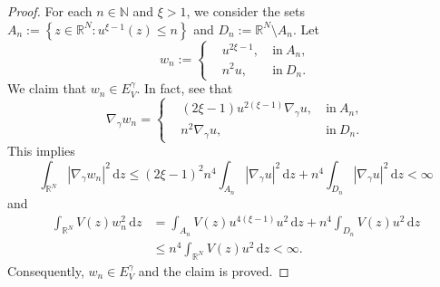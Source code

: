 \documentclass[12pt]{amsart}
\newcommand{\R}{\mathbb{R}}
\begin{document}
\begin{proof}
	For each $n \in \mathbb{N}$ and $\xi>1$, we consider the sets $A_n:=\left\lbrace z \in \mathbb{R}^N : u^{\xi-1}(z) \leq n\right\rbrace $ and $D_n:= \mathbb{R}^N \setminus A_n$. 
Let
	$$
	w_n:=\left\{
	\begin{aligned}
		& u^{2\xi-1} ,\ &\mbox{in} \ A_n, \\
		&n^2u, \ &\mbox{in} \ D_n.
	\end{aligned}
	\right.
	$$
We claim that \(w_n \in E_V^\gamma\). In fact, see that
	$$
	\nabla_{\gamma}w_n=\left\{
	\begin{aligned}
		& (2\xi-1)u^{2(\xi-1)}\nabla_{\gamma}u ,\ &\mbox{in} \ A_n, \\
		&n^2\nabla_{\gamma}u, \ &\mbox{in} \ D_n.
	\end{aligned}
	\right.
	$$
    This implies
	$$
	\int_{\R^N}|\nabla_{\gamma} w_n|^2\,\mathrm{d}z \leq (2\xi-1)^2n^4\int_{A_n}|\nabla_\gamma u|^2\,\mathrm{d}z + n^4\int_{D_n}|\nabla_\gamma u|^2\,\mathrm{d}z<\infty
	$$
	and
\[
\begin{aligned}
    \int_{\R^N}V(z)w_n^2\,\mathrm{d}z &= \int_{A_n}V(z)u^{4(\xi-1)}u^2\,\mathrm{d}z + n^4\int_{D_n}V(z)u^2\,\mathrm{d}z 
    \\
    &\leq n^4\int_{\R^N}V(z)u^2\,\mathrm{d}z<\infty.
\end{aligned}
\]
Consequently, $w_n \in E_V^\gamma$ and the claim is proved.


\end{proof}
\end{document}
